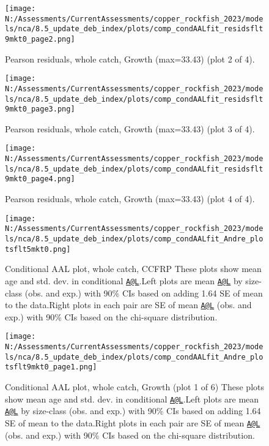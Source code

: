 \documentclass[11pt,
  english,
  letterpaper,
]{article}
\begin{document}
\begin{figure}
\centering
\texttt{[image: N:/Assessments/CurrentAssessments/copper\_rockfish\_2023/models/nca/8.5\_update\_deb\_index/plots/comp\_condAALfit\_residsflt9mkt0\_page2.png]}
\caption{Pearson residuals, whole catch, Growth (max=33.43) (plot 2 of 4).\label{fig:comp_condAALfit_residsflt9mkt0_page2}}
\end{figure}

\begin{figure}
\centering
\texttt{[image: N:/Assessments/CurrentAssessments/copper\_rockfish\_2023/models/nca/8.5\_update\_deb\_index/plots/comp\_condAALfit\_residsflt9mkt0\_page3.png]}
\caption{Pearson residuals, whole catch, Growth (max=33.43) (plot 3 of 4).\label{fig:comp_condAALfit_residsflt9mkt0_page3}}
\end{figure}

\begin{figure}
\centering
\texttt{[image: N:/Assessments/CurrentAssessments/copper\_rockfish\_2023/models/nca/8.5\_update\_deb\_index/plots/comp\_condAALfit\_residsflt9mkt0\_page4.png]}
\caption{Pearson residuals, whole catch, Growth (max=33.43) (plot 4 of 4).\label{fig:comp_condAALfit_residsflt9mkt0_page4}}
\end{figure}

\begin{figure}
\centering
\texttt{[image: N:/Assessments/CurrentAssessments/copper\_rockfish\_2023/models/nca/8.5\_update\_deb\_index/plots/comp\_condAALfit\_Andre\_plotsflt5mkt0.png]}
\caption{Conditional AAL plot, whole catch, CCFRP These plots show mean age and std. dev. in conditional \href{mailto:A@L}{\nolinkurl{A@L}}.Left plots are mean \href{mailto:A@L}{\nolinkurl{A@L}} by size-class (obs. and exp.) with 90\% CIs based on adding 1.64 SE of mean to the data.Right plots in each pair are SE of mean \href{mailto:A@L}{\nolinkurl{A@L}} (obs. and exp.) with 90\% CIs based on the chi-square distribution.\label{fig:comp_condAALfit_Andre_plotsflt5mkt0}}
\end{figure}

\begin{figure}
\centering
\texttt{[image: N:/Assessments/CurrentAssessments/copper\_rockfish\_2023/models/nca/8.5\_update\_deb\_index/plots/comp\_condAALfit\_Andre\_plotsflt9mkt0\_page1.png]}
\caption{Conditional AAL plot, whole catch, Growth (plot 1 of 6) These plots show mean age and std. dev. in conditional \href{mailto:A@L}{\nolinkurl{A@L}}.Left plots are mean \href{mailto:A@L}{\nolinkurl{A@L}} by size-class (obs. and exp.) with 90\% CIs based on adding 1.64 SE of mean to the data.Right plots in each pair are SE of mean \href{mailto:A@L}{\nolinkurl{A@L}} (obs. and exp.) with 90\% CIs based on the chi-square distribution.\label{fig:comp_condAALfit_Andre_plotsflt9mkt0_page1}}
\end{figure}
\end{document}
